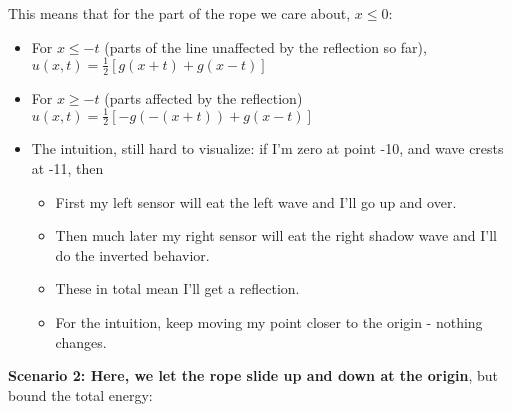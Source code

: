 \documentclass[11pt, oneside]{article}   	%
\begin{document}
This means that for the part of the rope we care about, $x \leq 0$:
\begin{itemize}
\item For $x \leq -t$ (parts of the line unaffected by the reflection so far),  $u(x,t)= \frac{1}{2}[g(x+t) + g(x-t)]$
\item For $x \geq -t$ (parts affected by the reflection)  $u(x,t) = \frac{1}{2} [-g(-(x+t)) + g(x-t)]$
\item The intuition, still hard to visualize: if I'm zero at point -10, and wave crests at -11, then
\begin{itemize}
\item First my left sensor will eat the left wave and I'll go up and over.  
\item Then much later my right sensor will eat the right shadow wave and I'll do the inverted behavior.
\item These in total mean I'll get a reflection.
\item For the intuition, keep moving my point closer to the origin - nothing changes.
\end{itemize}
\end{itemize}

\textbf{Scenario 2: Here, we let the rope slide up and down at the origin}, but bound the total energy:
\end{document}
